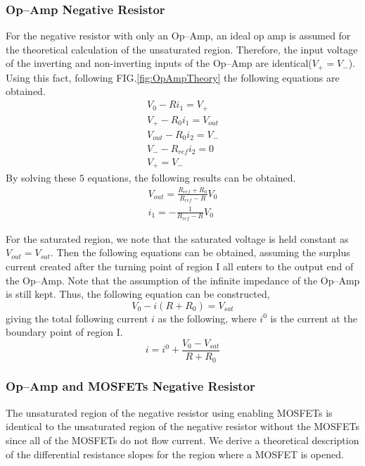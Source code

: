 \documentclass[%
 aip,
amsmath,amssymb,
reprint,
]{revtex4-1}
\begin{document}
\subsubsection{\label{opampiv}Op--Amp Negative Resistor}
For the negative resistor with only an Op--Amp, an ideal op amp is assumed for the theoretical calculation of the unsaturated region. Therefore, the input voltage of the inverting and non-inverting inputs of the Op--Amp are identical($V_+=V_-$). Using this fact, following FIG.\ref{fig:OpAmpTheory} the following equations are obtained.
\begin{eqnarray}
  V_0-Ri_1 = V_+\\
  V_+ -R_0i_1 = V_{out}\\
  V_{out}-R_0i_2=V_-\\
  V_--R_{ref}i_2=0\\
  V_+ = V_-
\end{eqnarray}
By solving these $5$ equations, the following results can be obtained.
\begin{eqnarray}
  V_{out} = \frac{R_{ref}+R_0}{R_{ref}-R}V_0\\
  i_1 = -\frac{1}{R_{ref}-R}V_0
\end{eqnarray}

For the saturated region, we note that the saturated voltage is held constant as $V_{out} = V_{sat}$. Then the following equations can be obtained, assuming the surplus current created after the turning point of region I all enters to the output end of the Op--Amp. Note that the assumption of the infinite impedance of the Op--Amp is still kept. Thus, the following equation can be constructed,
\begin{equation}
    V_{0} -i(R+R_0) = V_{sat}
\end{equation}
giving the total following current $i$ as the following, where $i^0$ is the current at the boundary point of region I.
\begin{equation}
    i = i^0+\frac{V_0-V_{sat}}{R+R_0}
\end{equation}


\subsubsection{\label{opamp_mosfetiv}Op--Amp and MOSFETs Negative Resistor}
The unsaturated region of the negative resistor using enabling MOSFETs is identical to the unsaturated region of the negative resistor without the MOSFETs since all of the MOSFETs do not flow current. We derive a theoretical description of the differential resistance slopes for the region where a MOSFET is opened. 
\end{document}
